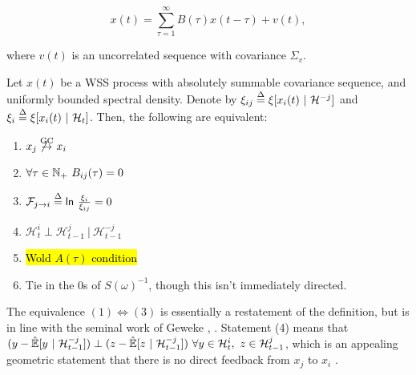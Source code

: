 \documentclass[12pt]{article}
\def\gc{\overset{\text{GC}}{\rightarrow}}  %
\newcommand{\linE}[2]{\hat{\E}[#1\ |\ #2]}  %
\newcommand{\linEerr}[2]{\xi[#1\ |\ #2]}  %
\begin{document}
\begin{equation}
  \label{eqn:ar_representation}
  x(t) = \sum_{\tau = 1}^\infty B(\tau) x(t - \tau) + v(t),
\end{equation}

where $v(t)$ is an uncorrelated sequence with covariance $\Sigma_v$.

\begin{theorem}
  \label{thm:gcg}
  Let $x(t)$ be a WSS process with absolutely summable covariance
  sequence, and uniformly bounded spectral density.  Denote by
  $\xi_{ij} \defeq \linEerr{x_i(t)}{\mathcal{H}^{-j}}$ and
  $\xi_i \defeq \linEerr{x_i(t)}{\mathcal{H}_t}$.  Then, the following are equivalent:

  \begin{enumerate}
    \item{$x_j \not\gc x_i$}
    \item{$\forall \tau \in \N_+\ B_{ij}(\tau) = 0$}
    \item{$\mathcal{F}_{j \rightarrow i} \overset{\Delta}{=} \mathsf{ln\ }\frac{\xi_i}{\xi_{ij}} = 0$}
    \item{$\mathcal{H}_t^{i} \perp \mathcal{H}_{t - 1}^{j}\ |\ \mathcal{H}_{t - 1}^{-j}$}
    \item{\hl{Wold $A(\tau)$ condition}}
    \item{Tie in the 0s of $S(\omega)^{-1}$, though this isn't immediately directed.}
  \end{enumerate}
\end{theorem}

The equivalence $(1) \iff (3)$ is essentially a restatement of the
definition, but is in line with the seminal work of Geweke
\cite{geweke1982measurement}, \cite{geweke1984}.  Statement (4) means that
$(y - \linE{y}{\mathcal{H}_{t - 1}^{-j}}) \perp (z -
\linE{z}{\mathcal{H}_{t - 1}^{-j}})\ \forall y \in \mathcal{H}_t^i,\ z \in
\mathcal{H}_{t - 1}^j$, which is an appealing geometric statement that
there is no direct feedback from $x_j$ to $x_i$ \cite{lindquist}.
\end{document}
